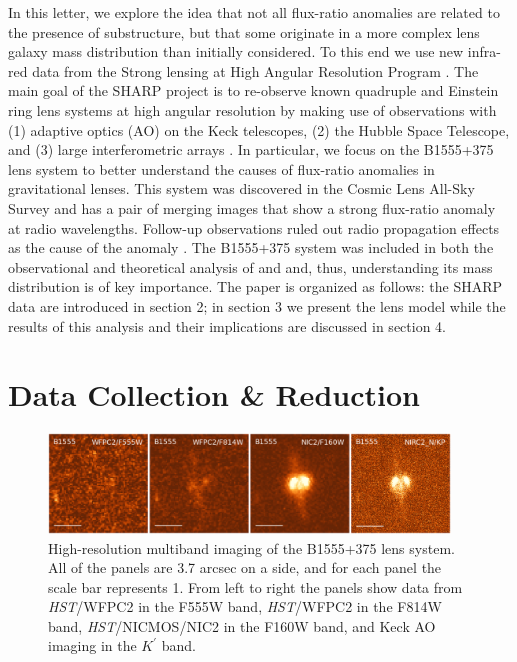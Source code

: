 \documentclass[useAMS,usenatbib]{mn2e}
\begin{document}
In this letter, we explore the idea that not all flux-ratio anomalies are
related to the presence of substructure, but that some originate in a
more complex lens galaxy mass distribution than initially
considered. To this end we use new infra-red data from the Strong
lensing at High Angular Resolution Program 
\citep[SHARP;][Fassnacht et al., in prep]{SHARP12, V12}.
The main goal of the SHARP project is to re-observe known
quadruple and Einstein ring lens systems at high angular
resolution by making use of observations with (1) adaptive optics (AO)
on the Keck telescopes, (2) the Hubble Space Telescope, and (3) large
interferometric arrays \citep{SHARP12,V12}. In particular, 
we focus on the B1555+375 lens system\citep{Marlow99} to better
understand the causes of flux-ratio anomalies in gravitational lenses.  This system was
discovered in the Cosmic Lens All-Sky Survey \citep{CLASS1,CLASS2} and
has a pair of merging images that show a strong flux-ratio anomaly at
radio wavelengths.  Follow-up observations ruled out radio propagation
effects as the cause of the anomaly \citep{K03,KD04}.  The B1555+375
system was included in both the observational and theoretical analysis
of \citet{Dalal2002} and \citet{Xu14} and, thus, understanding its
mass distribution is of key importance.  
The paper is organized as follows: the  SHARP data are
introduced in section 2; in section 3 we present the lens model while
the results of this analysis and their implications are discussed in
section 4.

\section{Data Collection \& Reduction}

\begin{figure}
\includegraphics[width=0.95\textwidth]{B1555_gallery.eps}
\caption{High-resolution multiband imaging of the B1555+375 lens system.
All of the panels are 3.7 arcsec on a side, and for each panel the scale bar 
represents 1\arcsec.  From left to right the panels show data from
\textit{HST}/WFPC2 in the F555W band, \textit{HST}/WFPC2 in the F814W band, \textit{HST}/NICMOS/NIC2
in the F160W band, and Keck AO imaging in the $K^\prime$ band.
\label{fig:multiband}}
%

\end{figure}
\end{document}
